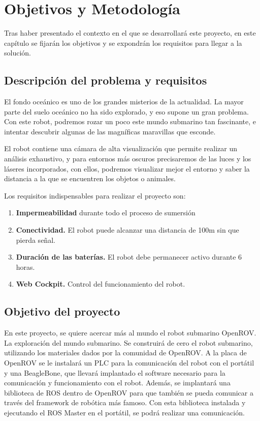 \chapter{Objetivos y Metodología}
\label{cap:objetivos}
Tras haber presentado el contexto en el que se desarrollará este proyecto, en este capítulo se fijarán los objetivos y se expondrán los requisitos para llegar a la solución.
\section{Descripción del problema y requisitos}
\label{sec:descripciondelproblema}

El fondo oceánico es uno de los grandes misterios de la actualidad. La mayor parte del suelo oceánico no ha sido explorado, y eso supone un gran problema. Con este robot, podremos rozar un poco este mundo submarino tan fascinante, e intentar descubrir algunas de las magníficas maravillas que esconde.

El robot contiene una cámara de alta visualización que permite realizar un análisis exhaustivo, y para entornos más oscuros precisaremos de las luces y los láseres incorporados, con ellos, podremos visualizar mejor el entorno y saber la distancia a la que se encuentren los objetos o animales. 

Los requisitos indispensables para realizar el proyecto son:
\begin{enumerate}
\item \textbf{Impermeabilidad} durante todo el proceso de sumersión
\item \textbf{Conectividad.} El robot puede alcanzar una distancia de 100m sin que pierda señal.
\item \textbf{Duración de las baterías.} El robot debe permanecer activo durante 6 horas. 
\item \textbf{Web Cockpit.} Control del funcionamiento del robot.
\end{enumerate}

\section{Objetivo del proyecto}
\label{sec:objetivos}

En este proyecto, se quiere acercar más al mundo el robot submarino OpenROV. La exploración del mundo submarino. 
Se construirá de cero el robot submarino, utilizando los materiales dados por la comunidad de OpenROV. A la placa de OpenROV se le instalará un PLC para la comunicación del robot con el portátil y una BeagleBone, que llevará implantado el software necesario para la comunicación y funcionamiento con el robot.
Además, se implantará una biblioteca de ROS dentro de OpenROV para que también se pueda comunicar a través del framework de robótica más famoso. Con esta biblioteca instalada y ejecutando el ROS Master en el portátil, se podrá realizar una comunicación.

